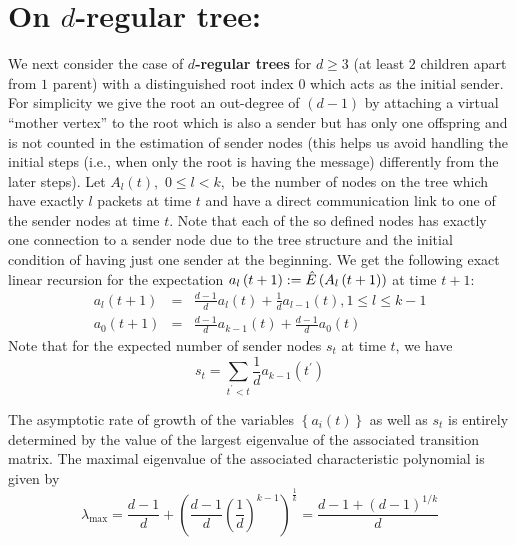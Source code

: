\noindent
\section{On $d$-regular tree:}
\noindent We next consider the case of {\bf $d$-regular trees} for $d\geq 3$ (at least $2$ children apart from $1$ parent) with a
distinguished root index $0$ which acts as the initial sender. For
simplicity we give the root an out-degree of $(d-1)$ by attaching a virtual
``mother vertex'' to the root which is also a sender but has only one
offspring and is not counted in the estimation of sender nodes (this helps
us avoid handling the initial steps (i.e., when only the root is having the
message) differently from the later steps). Let $A_{l}\left( t\right) ,$ $%
0\leq l<k,$ be the number of nodes on the tree which have exactly $l$
packets at time $t$ and have a direct communication link to one of the
sender nodes at time $t$. Note that each of the so defined nodes has exactly
one connection to a sender node due to the tree structure and the initial
condition of having just one sender at the beginning. We get the following
 exact linear recursion for the expectation $a_{l}\left( t+1\right) :=\hat{%
E}\left( A_{l}\left( t+1\right) \right) $ at time $t+1:$%
\begin{eqnarray*}
\nonumber
a_{l}\left( t+1\right) &=&\frac{d-1}{d}a_{l}\left( t\right) +\frac{1}{d}%
a_{l-1}\left( t\right) ,1\leq l\leq k-1 \\ \nonumber
a_{0}\left( t+1\right) &=&\frac{d-1}{d}a_{k-1}\left( t\right) +\frac{d-1}{d}%
a_{0}\left( t\right) \nonumber
\end{eqnarray*}%
Note that for the expected number of sender nodes $s_{t}$ at time $t$, we
have 
\begin{equation}
s_{t}=\sum\limits_{t^{\prime }<t}\frac{1}{d}a_{k-1}\left( t^{\prime }\right)
\end{equation}

The asymptotic rate of growth of the variables $\left\{ a_{i}\left( t\right)
\right\} $ as well as $s_{t}$ is entirely determined by the value of the
largest eigenvalue of the associated transition matrix. The maximal
eigenvalue of the associated characteristic polynomial is given by 
\begin{equation*}
\lambda _{\max }=\frac{d-1}{d}+\left( \frac{d-1}{d}\left( \frac{1}{d}\right)
^{k-1}\right) ^{\frac{1}{k}}=\frac{d-1+\left( d-1\right) ^{1/k}}{d}
\end{equation*}


